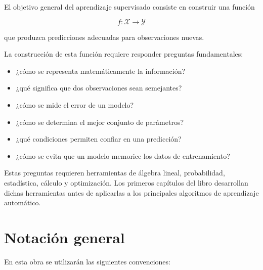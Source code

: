 \documentclass[
  spanish,
  10.5pt,
  letterpaper,
  DIV=11,
  numbers=noendperiod,
  oneside,
  open=any]{scrreprt}
\providecommand{\tightlist}{%
  \setlength{\itemsep}{0pt}\setlength{\parskip}{0pt}}
\theoremstyle{definition}
\theoremstyle{definition}
\theoremstyle{plain}
\theoremstyle{remark}
\begin{document}
El objetivo general del aprendizaje supervisado consiste en construir
una función

\[
f:\mathcal{X}\longrightarrow\mathcal{Y}
\]

que produzca predicciones adecuadas para observaciones nuevas.

La construcción de esta función requiere responder preguntas
fundamentales:

\begin{itemize}
\tightlist
\item
  ¿cómo se representa matemáticamente la información?
\item
  ¿qué significa que dos observaciones sean semejantes?
\item
  ¿cómo se mide el error de un modelo?
\item
  ¿cómo se determina el mejor conjunto de parámetros?
\item
  ¿qué condiciones permiten confiar en una predicción?
\item
  ¿cómo se evita que un modelo memorice los datos de entrenamiento?
\end{itemize}

Estas preguntas requieren herramientas de álgebra lineal, probabilidad,
estadística, cálculo y optimización. Los primeros capítulos del libro
desarrollan dichas herramientas antes de aplicarlas a los principales
algoritmos de aprendizaje automático.


\chapter*{Notación general}\label{notaciuxf3n-general}


En esta obra se utilizarán las siguientes convenciones:
\end{document}
